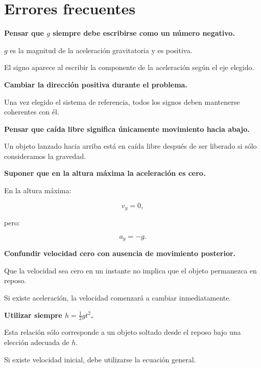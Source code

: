 \section{Errores frecuentes}

\begin{errorfrecuente}
\textbf{Pensar que \(g\) siempre debe escribirse como un número negativo.}

\(g\) es la magnitud de la aceleración gravitatoria y es positiva.

El signo aparece al escribir la componente de la aceleración según el eje elegido.
\end{errorfrecuente}


\begin{errorfrecuente}
\textbf{Cambiar la dirección positiva durante el problema.}

Una vez elegido el sistema de referencia, todos los signos deben mantenerse coherentes con él.
\end{errorfrecuente}


\begin{errorfrecuente}
\textbf{Pensar que caída libre significa únicamente movimiento hacia abajo.}

Un objeto lanzado hacia arriba está en caída libre después de ser liberado si sólo consideramos la gravedad.
\end{errorfrecuente}


\begin{errorfrecuente}
\textbf{Suponer que en la altura máxima la aceleración es cero.}

En la altura máxima:

\[ v_y=0, \]

pero:

\[ a_y=-g. \]
\end{errorfrecuente}


\begin{errorfrecuente}
\textbf{Confundir velocidad cero con ausencia de movimiento posterior.}

Que la velocidad sea cero en un instante no implica que el objeto permanezca en reposo.

Si existe aceleración, la velocidad comenzará a cambiar inmediatamente.
\end{errorfrecuente}


\begin{errorfrecuente}
\textbf{Utilizar siempre \(h=\frac{1}{2}gt^2\).}

Esta relación sólo corresponde a un objeto soltado desde el reposo bajo una elección adecuada de \(h\).

Si existe velocidad inicial, debe utilizarse la ecuación general.
\end{errorfrecuente}


